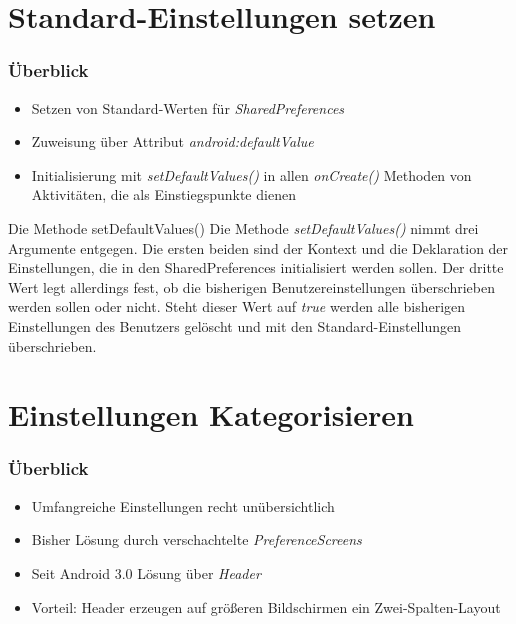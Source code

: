 \section{Standard-Einstellungen setzen}
\begin{frame}
   \frametitle{Überblick}
   \begin{itemize}
      \item Setzen von Standard-Werten für \emph{SharedPreferences}
      \item Zuweisung über Attribut \emph{android:defaultValue}
      \item Initialisierung mit \emph{setDefaultValues()} in allen \emph{onCreate()} 
      	Methoden von Aktivitäten, die als Einstiegspunkte dienen
   \end{itemize}

   

   \begin{alertblock}{Die Methode setDefaultValues()}
      Die Methode \emph{setDefaultValues()} nimmt drei Argumente entgegen. 
      Die ersten beiden sind der Kontext und die Deklaration 
      der Einstellungen, die in den SharedPreferences initialisiert werden sollen. 
      Der dritte Wert legt allerdings fest, ob die bisherigen Benutzereinstellungen 
      überschrieben werden sollen oder nicht. Steht dieser Wert auf \emph{true} 
      werden alle bisherigen Einstellungen des Benutzers gelöscht und mit den 
      Standard-Einstellungen überschrieben.
   \end{alertblock}
\end{frame}

\section{Einstellungen Kategorisieren}
\begin{frame}
   \frametitle{Überblick}
   \begin{itemize}
      \item Umfangreiche Einstellungen recht unübersichtlich
      \item Bisher Lösung durch verschachtelte \emph{PreferenceScreens}
      \item Seit Android 3.0 Lösung über \emph{Header}
      \item Vorteil: Header erzeugen auf größeren Bildschirmen ein Zwei-Spalten-Layout
   \end{itemize}

   
\end{frame}

